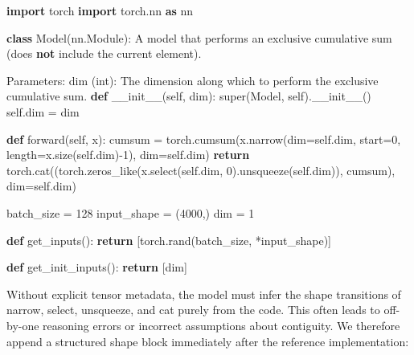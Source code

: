 \documentclass[
  10
]{article}
\newenvironment{Shaded}{}{}
\newcommand{\BuiltInTok}[1]{\textcolor[rgb]{0.00,0.50,0.00}{#1}}
\newcommand{\CommentTok}[1]{\textcolor[rgb]{0.38,0.63,0.69}{\textit{#1}}}
\newcommand{\ControlFlowTok}[1]{\textcolor[rgb]{0.00,0.44,0.13}{\textbf{#1}}}
\newcommand{\DecValTok}[1]{\textcolor[rgb]{0.25,0.63,0.44}{#1}}
\newcommand{\FunctionTok}[1]{\textcolor[rgb]{0.02,0.16,0.49}{#1}}
\newcommand{\ImportTok}[1]{\textcolor[rgb]{0.00,0.50,0.00}{\textbf{#1}}}
\newcommand{\KeywordTok}[1]{\textcolor[rgb]{0.00,0.44,0.13}{\textbf{#1}}}
\newcommand{\NormalTok}[1]{#1}
\newcommand{\OperatorTok}[1]{\textcolor[rgb]{0.40,0.40,0.40}{#1}}
\newcommand{\VariableTok}[1]{\textcolor[rgb]{0.10,0.09,0.49}{#1}}
\begin{document}
\begin{Shaded}
\begin{Highlighting}[]
\ImportTok{import}\NormalTok{ torch}
\ImportTok{import}\NormalTok{ torch.nn }\ImportTok{as}\NormalTok{ nn}

\KeywordTok{class}\NormalTok{ Model(nn.Module):}
    \CommentTok{\textquotesingle{}\textquotesingle{}}\NormalTok{A model that performs an exclusive cumulative }\BuiltInTok{sum}\NormalTok{ (does }\KeywordTok{not}\NormalTok{ include the current element).}

\NormalTok{    Parameters:}
\NormalTok{    dim (}\BuiltInTok{int}\NormalTok{): The dimension along which to perform the exclusive cumulative }\BuiltInTok{sum}\NormalTok{.}
    \KeywordTok{def} \FunctionTok{\_\_init\_\_}\NormalTok{(}\VariableTok{self}\NormalTok{, dim):}
    \BuiltInTok{super}\NormalTok{(Model, }\VariableTok{self}\NormalTok{).}\FunctionTok{\_\_init\_\_}\NormalTok{()}
    \VariableTok{self}\NormalTok{.dim }\OperatorTok{=}\NormalTok{ dim}

    \KeywordTok{def}\NormalTok{ forward(}\VariableTok{self}\NormalTok{, x):}
\NormalTok{    cumsum }\OperatorTok{=}\NormalTok{ torch.cumsum(x.narrow(dim}\OperatorTok{=}\VariableTok{self}\NormalTok{.dim, start}\OperatorTok{=}\DecValTok{0}\NormalTok{, length}\OperatorTok{=}\NormalTok{x.size(}\VariableTok{self}\NormalTok{.dim)}\OperatorTok{{-}}\DecValTok{1}\NormalTok{), dim}\OperatorTok{=}\VariableTok{self}\NormalTok{.dim)}
    \ControlFlowTok{return}\NormalTok{ torch.cat((torch.zeros\_like(x.select(}\VariableTok{self}\NormalTok{.dim, }\DecValTok{0}\NormalTok{).unsqueeze(}\VariableTok{self}\NormalTok{.dim)), cumsum), dim}\OperatorTok{=}\VariableTok{self}\NormalTok{.dim)}

\NormalTok{batch\_size }\OperatorTok{=} \DecValTok{128}
\NormalTok{input\_shape }\OperatorTok{=}\NormalTok{ (}\DecValTok{4000}\NormalTok{,)}
\NormalTok{dim }\OperatorTok{=} \DecValTok{1}

\KeywordTok{def}\NormalTok{ get\_inputs():}
    \ControlFlowTok{return}\NormalTok{ [torch.rand(batch\_size, }\OperatorTok{*}\NormalTok{input\_shape)]}

\KeywordTok{def}\NormalTok{ get\_init\_inputs():}
    \ControlFlowTok{return}\NormalTok{ [dim] }
\end{Highlighting}
\end{Shaded}

Without explicit tensor metadata, the model must infer the shape
transitions of narrow, select, unsqueeze, and cat purely from the code.
This often leads to off-by-one reasoning errors or incorrect assumptions
about contiguity. We therefore append a structured shape block
immediately after the reference implementation:
\end{document}
